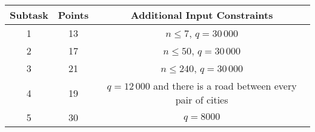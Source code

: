\begin{center}
\renewcommand{\arraystretch}{1.5}
\begin{tabular}{|c|c|c|}
\hline
Subtask & Points & Additional Input Constraints\\
\hline
1 &  13 & $n \leq 7$, $q = 30\,000$ \\
\hline
2 & 17 &  $n \leq 50$, $q = 30\,000$\\
\hline
3 & 21 & $n \leq 240$, $q = 30\,000$\\
\hline
4 & 19 & $q = 12\,000$ and there is a road between every pair of cities \\
\hline
5 & 30 & $q = 8000$ \\
\hline
\end{tabular}
\end{center}